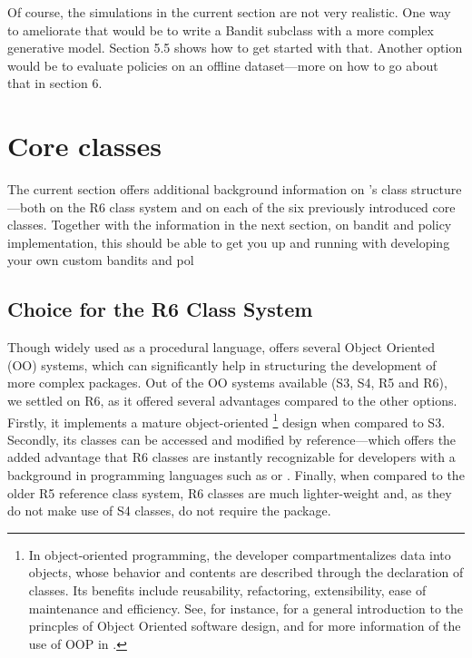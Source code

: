 \documentclass{jss}
\begin{document}
Of course, the simulations in the current section are not very realistic. One way to ameliorate that would be to write a Bandit subclass with a more complex generative model. Section 5.5 shows how to get started with that. Another option would be to evaluate policies on an offline dataset---more on how to go about that in section 6.

\section{Core classes} \label{classstructure}

The current section offers additional background information on 's class structure---both on the R6 class system \cite{R6} and on each of the six previously introduced core  classes. Together with the information in the next section, on bandit and policy implementation, this should be able to get you up and running with developing your own custom bandits and pol

\subsection{Choice for the R6 Class System} \label{classsystem}

Though widely used as a procedural language,  offers several Object Oriented (OO) systems, which can significantly help in structuring the development of more complex packages. Out of the OO systems available (S3, S4, R5 and R6), we settled on R6, as it offered several advantages compared to the other options. Firstly, it implements a mature object-oriented \footnote{In object-oriented programming, the developer compartmentalizes data into objects, whose behavior and contents are described through the declaration of classes. Its benefits include reusability, refactoring, extensibility, ease of maintenance and efficiency. See, for instance, \cite{Wirfs-Brock1990} for a general introduction to the princples of Object Oriented software design, and \cite{wickham2014advanced} for more information of the use of OOP in .} design when compared to S3. Secondly, its classes can be accessed and modified by reference---which offers the added advantage that R6 classes are instantly recognizable for developers with a background in programming languages such as  or . Finally, when compared to the older R5 reference class system, R6 classes are much lighter-weight and, as they do not make use of S4 classes, do not require the  package.
\end{document}

